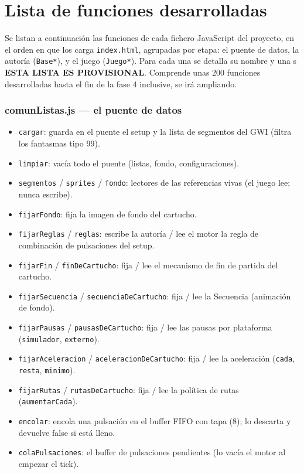 \documentclass[../main.tex]{subfiles}
\begin{document}
	\chapter{Lista de funciones desarrolladas}
	\label{sec:ListaFuncionesDerarrolladas}
	
	Se listan a continuación las funciones de cada fichero JavaScript
	del proyecto, en el orden en que los carga \texttt{index.html},
	agrupadas por etapa: el puente de datos, la autoría (\texttt{Base*}),
	y el juego (\texttt{Juego*}). Para cada una se detalla su nombre y una
	s
	\textbf{ESTA LISTA ES PROVISIONAL}. Comprende unas 200 funciones desarrolladas hasta el fin de la fase 4 inclusive, se irá ampliando.
	
	\subsection*{comunListas.js — el puente de datos}
	
	\begin{itemize}
		\item \texttt{cargar}: guarda en el puente el setup y la lista de
		segmentos del GWI (filtra los fantasmas tipo 99).
		\item \texttt{limpiar}: vacía todo el puente (listas, fondo,
		configuraciones).
		\item \texttt{segmentos} / \texttt{sprites} / \texttt{fondo}:
		lectores de las referencias vivas (el juego lee; nunca escribe).
		\item \texttt{fijarFondo}: fija la imagen de fondo del cartucho.
		\item \texttt{fijarReglas} / \texttt{reglas}: escribe la autoría /
		lee el motor la regla de combinación de pulsaciones del setup.
		\item \texttt{fijarFin} / \texttt{finDeCartucho}: fija / lee el
		mecanismo de fin de partida del cartucho.
		\item \texttt{fijarSecuencia} / \texttt{secuenciaDeCartucho}: fija /
		lee la Secuencia (animación de fondo).
		\item \texttt{fijarPausas} / \texttt{pausasDeCartucho}: fija / lee
		las pausas por plataforma (\texttt{simulador}, \texttt{externo}).
		\item \texttt{fijarAceleracion} / \texttt{aceleracionDeCartucho}:
		fija / lee la aceleración (\texttt{cada}, \texttt{resta},
		\texttt{minimo}).
		\item \texttt{fijarRutas} / \texttt{rutasDeCartucho}: fija / lee la
		política de rutas (\texttt{aumentarCada}).
		\item \texttt{encolar}: encola una pulsación en el buffer FIFO con
		tapa (8); lo descarta y devuelve false si está lleno.
		\item \texttt{colaPulsaciones}: el buffer de pulsaciones pendientes
		(lo vacía el motor al empezar el tick).
	\end{itemize}
	
\end{document}
